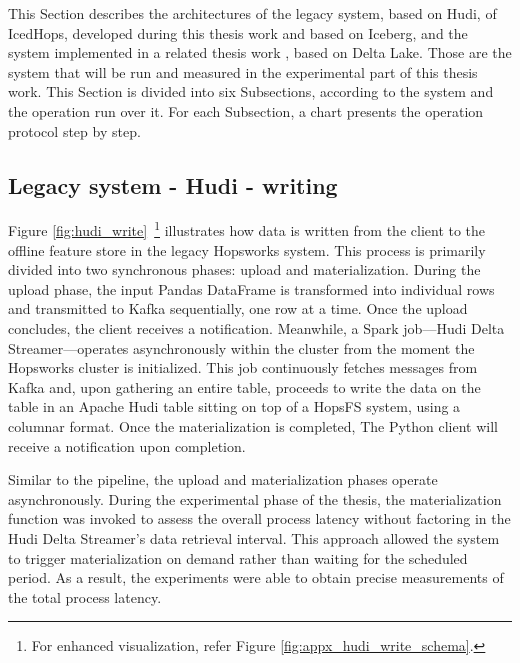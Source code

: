 This Section describes the architectures of the legacy system, based on Hudi, of IcedHops, developed during this thesis work and based on Iceberg, and the system implemented in a related thesis work \cite{manfrediReducingReadWrite2024}, based on Delta Lake. Those are the system that will be run and measured in the experimental part of this thesis work. This Section is divided into six Subsections, according to the system and the operation run over it. For each Subsection, a chart presents the operation protocol step by step.



\subsection{Legacy system - Hudi - writing}
\label{subsec:back_sys_hudi_write}

Figure \ref{fig:hudi_write}~\footnote{For enhanced visualization, refer Figure \ref{fig:appx_hudi_write_schema}.} illustrates how data is written from the client to the offline feature store in the legacy Hopsworks system. This process is primarily divided into two synchronous phases: upload and materialization. During the upload phase, the input Pandas DataFrame is transformed into individual rows and transmitted to Kafka sequentially, one row at a time. Once the upload concludes, the client receives a notification. Meanwhile, a Spark job—Hudi Delta Streamer—operates asynchronously within the cluster from the moment the Hopsworks cluster is initialized. This job continuously fetches messages from Kafka and, upon gathering an entire table, proceeds to write the data on the table in an Apache Hudi table sitting on top of a \gls{HopsFS} system, using a columnar format. Once the materialization is completed, The Python client will receive a notification upon completion.

Similar to the pipeline, the upload and materialization phases operate asynchronously. During the experimental phase of the thesis, the materialization function was invoked to assess the overall process latency without factoring in the Hudi Delta Streamer's data retrieval interval. This approach allowed the system to trigger materialization on demand rather than waiting for the scheduled period. As a result, the experiments were able to obtain precise measurements of the total process latency.

